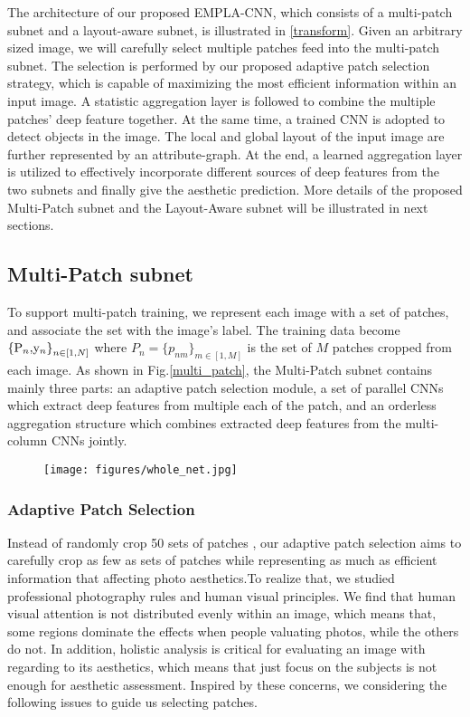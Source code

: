 \documentclass[10pt,twocolumn,letterpaper]{article}
\begin{document}
The architecture of our proposed EMPLA-CNN, which consists of a multi-patch subnet 
and a layout-aware subnet, is illustrated in \ref{transform}. Given an arbitrary sized 
image, we will carefully select multiple patches feed into the multi-patch
subnet. The selection is performed by our proposed adaptive patch selection strategy, which
is capable of maximizing the most efficient information within an input image. A statistic 
aggregation layer is followed to combine the multiple patches' deep feature together.
At the same time, a trained CNN is adopted to detect objects in the image. The local 
and global layout of the input image are further represented by an attribute-graph. 
At the end, a learned aggregation layer is utilized to effectively incorporate different 
sources of deep features from the two subnets and finally give the aesthetic prediction. 
More details of the proposed Multi-Patch subnet and the Layout-Aware subnet will be 
illustrated in next sections. 

\subsection{Multi-Patch subnet}
To support multi-patch training, we represent each image with a set of patches, 
and associate the set with the image's label.
The training data become ${{\rm{\{ }}{{\rm{P}}_n}{\rm{, }}{{\rm{y}}_n}{\rm{\} }}_{n \in [1,N]}}$ 
where ${P_n} = {\{ {p_{nm}}\} _{m \in [1,M]}}$ is the set of $M$ patches cropped from each image. 
As shown in Fig.\ref{multi_patch}, the Multi-Patch subnet contains mainly three parts: an adaptive 
patch selection module, a set of parallel CNNs which extract deep features from multiple 
each of the patch, and an orderless aggregation structure which combines 
extracted deep features from the multi-column CNNs jointly.

\begin{figure}
	\centering
	\texttt{[image: figures/whole\_net.jpg]}
	\label{whole_net}
\end{figure}

\subsubsection{Adaptive Patch Selection}
Instead of randomly crop 50 sets of patches \cite{Lu:2015:ICCV}, 
our adaptive patch selection aims to carefully crop as few as 
sets of patches while representing as much as efficient information 
that affecting photo aesthetics.To realize that, we studied professional 
photography rules and human visual principles. 
We find that human visual attention is not distributed evenly within an image, 
which means that, some regions dominate the effects when people valuating
photos, while the others do not. In addition, holistic analysis is critical 
for evaluating an image with regarding to its aesthetics, which means that 
just focus on the subjects is not enough for aesthetic assessment.
Inspired by these concerns, we considering the following issues to 
guide us selecting patches.
\end{document}
